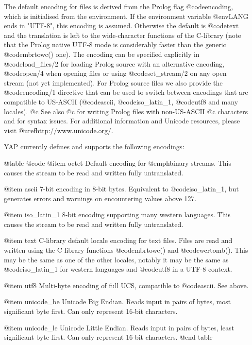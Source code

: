 {{{{The default encoding for files is derived from the Prolog flag
@code{encoding}, which is initialised from the environment.  If the
environment variable @env{LANG} ends in "UTF-8", this encoding is
assumed. Otherwise the default is @code{text} and the translation is
left to the wide-character functions of the C-library (note that the
Prolog native UTF-8 mode is considerably faster than the generic
@code{mbrtowc()} one).  The encoding can be specified explicitly in
@code{load_files/2} for loading Prolog source with an alternative
encoding, @code{open/4} when opening files or using @code{set_stream/2} on
any open stream (not yet implemented). For Prolog source files we also
provide the @code{encoding/1} directive that can be used to switch
between encodings that are compatible to US-ASCII (@code{ascii},
@code{iso_latin_1}, @code{utf8} and many locales).  
@c See also
@c  for writing Prolog files with non-US-ASCII
@c characters and  for syntax issues. 
For
additional information and Unicode resources, please visit
@uref{http://www.unicode.org/}.

YAP currently defines and supports the following encodings:

@table @code
@item  octet
Default encoding for @emph{binary} streams.  This causes
the stream to be read and written fully untranslated.

@item  ascii
7-bit encoding in 8-bit bytes.  Equivalent to @code{iso_latin_1},
but generates errors and warnings on encountering values above
127.

@item  iso_latin_1
8-bit encoding supporting many western languages.  This causes
the stream to be read and written fully untranslated.

@item  text
C-library default locale encoding for text files.  Files are read and
written using the C-library functions @code{mbrtowc()} and
@code{wcrtomb()}.  This may be the same as one of the other locales,
notably it may be the same as @code{iso_latin_1} for western
languages and @code{utf8} in a UTF-8 context.

@item  utf8
Multi-byte encoding of full UCS, compatible to @code{ascii}.
See above.

@item  unicode_be
Unicode Big Endian.  Reads input in pairs of bytes, most
significant byte first.  Can only represent 16-bit characters.

@item  unicode_le
Unicode Little Endian.  Reads input in pairs of bytes, least
significant byte first.  Can only represent 16-bit characters.
@end table 

}}}}
